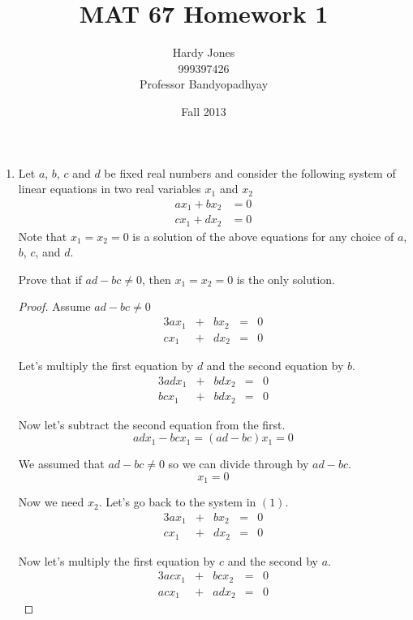 \documentclass[12pt,letterpaper]{article}
\title{MAT 67 Homework 1\vspace{-2ex}}
\author{Hardy Jones\\
        999397426\\
        Professor Bandyopadhyay\vspace{-2ex}}
\date{Fall 2013}
\begin{document}
  \maketitle

  \begin{enumerate}
    \item
      Let $a$, $b$, $c$ and $d$ be fixed real numbers and
      consider the following system of linear equations in two real variables
      $x_1$ and $x_2$
      \begin{align*}
        ax_1 + bx_2 &= 0 \\
        cx_1 + dx_2 &= 0
      \end{align*}
      Note that $x_1 = x_2 = 0$ is a solution of the above equations for any
      choice of $a$, $b$, $c$, and $d$.

      Prove that if $ad - bc \neq 0$, then $x_1 = x_2 = 0$ is the only solution.

      \begin{proof}
        Assume $ad - bc \neq 0$
        \begin{alignat*}{3}
          ax_1 & {} + {} & bx_2 & {} = {} & 0 \\
          cx_1 & {} + {} & dx_2 & {} = {} & 0 \tag{1}
        \end{alignat*}

        Let's multiply the first equation by $d$ and the second equation by $b$.
        \begin{alignat*}{3}
          adx_1 & {} + {} & bdx_2 & {} = {} & 0 \\
          bcx_1 & {} + {} & bdx_2 & {} = {} & 0
        \end{alignat*}

        Now let's subtract the second equation from the first.
        \[adx_1 - bcx_1 = (ad - bc)x_1 = 0\]

        We assumed that $ad-bc \neq 0$ so we can divide through by $ad - bc$.
        \[x_1 = 0\]

        Now we need $x_2$.  Let's go back to the system in $(1)$.
        \begin{alignat*}{3}
          ax_1 & {} + {} & bx_2 & {} = {} & 0 \\
          cx_1 & {} + {} & dx_2 & {} = {} & 0 \tag{1}
        \end{alignat*}

        Now let's multiply the first equation by $c$ and the second by $a$.
        \begin{alignat*}{3}
          acx_1 & {} + {} & bcx_2 & {} = {} & 0 \\
          acx_1 & {} + {} & adx_2 & {} = {} & 0
        \end{alignat*}


\end{proof}
\end{enumerate}
\end{document}
